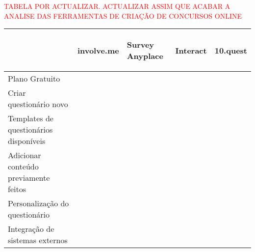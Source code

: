 \textcolor{red}{TABELA POR ACTUALIZAR. ACTUALIZAR ASSIM QUE ACABAR A ANALISE DAS FERRAMENTAS DE CRIAÇÃO DE CONCURSOS ONLINE}
	
	
	
	
	
\renewcommand{\arraystretch}{2}
\setlength\arrayrulewidth{1pt}
\begin{table}[!ht]  
	\begin{center}
		\begin{tabular}{|p{4cm}|p{0.1cm}|p{0.1cm}|p{0.1cm}|p{0.1cm}|}
			\cline{2-5}
			\multicolumn{1}{c|}{} & \hspace{0.2cm}\begin{sideways}involve.me\end{sideways} & \hspace{0.4cm}\begin{sideways}Survey Anyplace\end{sideways} & \hspace{0.2cm}\begin{sideways}Interact\end{sideways} &\hspace{0.2cm}\begin{sideways} 10.quest\end{sideways}\\ \hline
			
			
			Plano Gratuito & \cellcolor{yellow!80}   & \cellcolor{red!80}  & \cellcolor{red!80} & \cellcolor{yellow!80}  \\ \hline
			
			Criar questionário novo & \cellcolor{green!80}  & \cellcolor{green!80}  & \cellcolor{green!80} & \cellcolor{green!80} \\ \hline
			
			Templates de questionários disponíveis& \cellcolor{green!80}  & \cellcolor{green!80} & \cellcolor{green!80} & \cellcolor{red!80}  \\ \hline
			
			Adicionar conteúdo previamente feitos & \cellcolor{red!80}   & \cellcolor{red!80}  & \cellcolor{red!80} & \cellcolor{green!80}  \\ \hline
			
			Personalização do questionário & \cellcolor{green!80}  & \cellcolor{green!80}  & \cellcolor{green!80} & \cellcolor{green!80} \\ \hline
			
			Integração de sistemas externos & \cellcolor{green!80}  & \cellcolor{green!80} & \cellcolor{green!80} & \cellcolor{red!80}  \\ \hline
			

\end{tabular}
\end{center}
\end{table}

